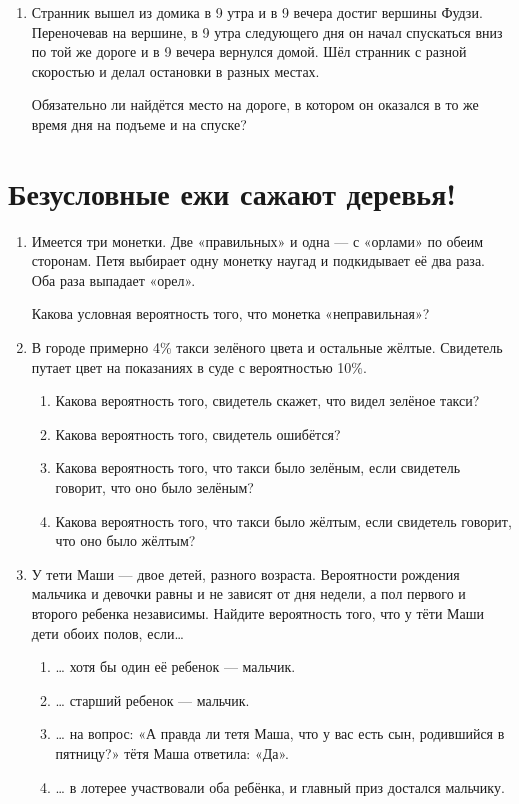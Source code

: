 \documentclass[12pt]{article}
\begin{document}
\begin{enumerate}
\item Странник вышел из домика в 9 утра и в 9 вечера достиг вершины Фудзи. 
Переночевав на вершине, в 9 утра следующего дня он начал спускаться вниз по той же дороге и 
в 9 вечера вернулся домой. Шёл странник с разной скоростью и делал остановки в разных местах.

Обязательно ли найдётся место на дороге, в котором он оказался в то же время дня на подъеме и на спуске?


\end{enumerate}

\newpage
\section{Безусловные ежи сажают деревья!}

\begin{enumerate}
    \item Имеется три монетки. Две «правильных» и одна — с «орлами» по обеим сторонам. 
    Петя выбирает одну монетку наугад и подкидывает её два раза. 
    Оба раза выпадает «орел». 

    Какова условная вероятность того, что монетка «неправильная»?    
    
    \item  В городе примерно 4\% такси зелёного цвета и остальные жёлтые. Свидетель путает цвет на показаниях в суде с вероятностью 10\%.

\begin{enumerate}
\item Какова вероятность того, свидетель скажет, что видел зелёное такси?
\item Какова вероятность того, свидетель ошибётся?
\item Какова вероятность того, что такси было зелёным, если свидетель говорит, что оно было зелёным?
\item Какова вероятность того, что такси было жёлтым, если свидетель говорит, что оно было жёлтым?
\end{enumerate}


    \item У тети Маши — двое детей, разного возраста. Вероятности рождения мальчика и девочки равны и не зависят от дня недели, а пол первого и второго ребенка независимы. 
    Найдите вероятность того, что у тёти Маши дети обоих полов, если\ldots
    \begin{enumerate}
    \item \ldots{ } хотя бы один её ребенок — мальчик.
    \item \ldots{ } старший ребенок — мальчик.
    \item \ldots{ } на вопрос: «А правда ли тетя Маша, что у вас есть сын, родившийся в пятницу?» тётя Маша ответила: «Да».
    \item \ldots{ } в лотерее участвовали оба ребёнка, и главный приз достался мальчику.
    \end{enumerate}
    


\end{enumerate}
\end{document}
